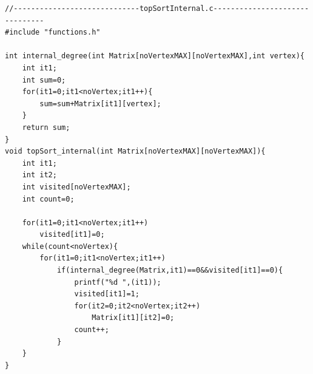 \documentclass[14pt]{article}
\begin{document}
\begin{lstlisting}
//-----------------------------topSortInternal.c-------------------------------
#include "functions.h"

int internal_degree(int Matrix[noVertexMAX][noVertexMAX],int vertex){
    int it1;
    int sum=0;
    for(it1=0;it1<noVertex;it1++){
        sum=sum+Matrix[it1][vertex];
    }
    return sum;
}
void topSort_internal(int Matrix[noVertexMAX][noVertexMAX]){
    int it1;
    int it2;
    int visited[noVertexMAX];
    int count=0;

    for(it1=0;it1<noVertex;it1++)
        visited[it1]=0;
    while(count<noVertex){
        for(it1=0;it1<noVertex;it1++)
            if(internal_degree(Matrix,it1)==0&&visited[it1]==0){
                printf("%d ",(it1));
                visited[it1]=1;
                for(it2=0;it2<noVertex;it2++)
                    Matrix[it1][it2]=0;
                count++;
            }
    }
}
\end{lstlisting}
\end{document}
